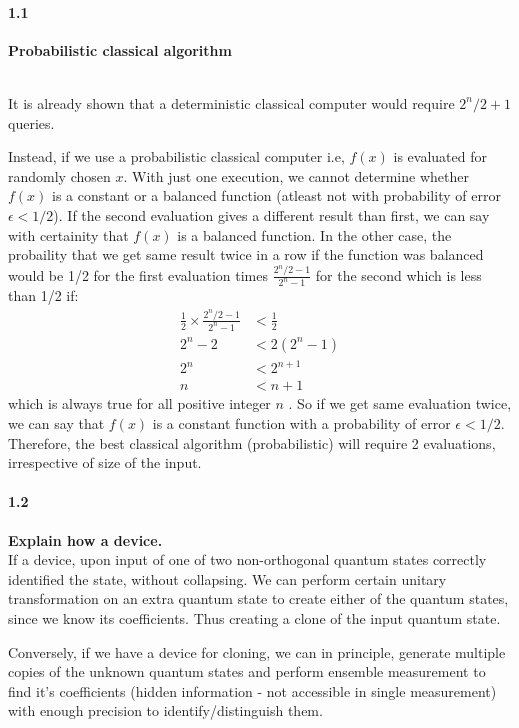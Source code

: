 \paragraph{1.1} \textbf{Probabilistic classical algorithm}

\\
It is already shown that a deterministic classical computer would require $2^n/2+1$ queries.

Instead, if we use a probabilistic classical computer i.e, $f(x)$ is evaluated for randomly chosen $x$. With just one execution, we cannot determine whether $f(x)$ is a constant or a balanced function (atleast not with probability of error $\epsilon < 1/2$). If the second evaluation gives a different result than first, we can say with certainity that $f(x)$ is a balanced function. In the other case, the probaility that we get same result twice in a row if the function was balanced would be 1/2 for the first evaluation times $\frac{2^n/2-1}{2^n-1}$ for the second which is less than 1/2 if:
\begin{equation}
\begin{split}
\frac{1}{2} \times \frac{2^n/2-1}{2^n-1} & < \frac{1}{2}\\
2^n-2 & < 2(2^n-1)\\
2^n & < 2^{n+1} \\
n & < n+1
\end{split}
\end{equation}
which is always true for all positive integer $n$ . So if we get same evaluation twice, we can say that $f(x)$ is a constant function with a probability of error $\epsilon < 1/2$. Therefore, the best classical algorithm (probabilistic) will require 2 evaluations, irrespective of size of the input.\\



\paragraph{1.2} \textbf{Explain how a device.}
\\
If a device, upon input of one of two non-orthogonal quantum states correctly identified the state, without collapsing. We can perform certain unitary transformation on an extra quantum state to create either of the quantum states, since we know its coefficients. Thus creating a clone of the input quantum state.

Conversely, if we have a device for cloning, we can in principle, generate multiple copies of the unknown quantum states and perform ensemble measurement to find it's coefficients (hidden information - not accessible in single measurement) with enough precision to identify/distinguish them.\\

